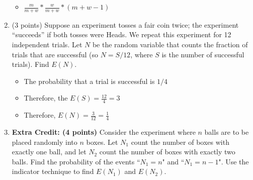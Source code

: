 \documentclass[11pt]{article}
\begin{document}
\begin{enumerate}
\begin{itemize}
	\item $\frac{m}{m+w}*\frac{w}{m+w}*(m+w-1)$
\end{itemize}

\item (3 points) Suppose an experiment tosses a fair coin twice;  the experiment
``succeeds'' if both tosses were Heads.  We repeat this experiment 
for 12 independent trials.  Let $N$ be the random variable that counts
the fraction of trials that are successful (so $N = S/12$, where
$S$ is the number of successful trials).  Find $E(N)$.

\begin{itemize}
	\item The probability that a trial is successful is $1/4$
	\item Therefore, the $E(S) = \frac{12}{4} = 3$
	\item Therefore, $E(N) = \frac{3}{12} = \frac{1}{4}$
\end{itemize}

\item \textbf{Extra Credit: (4 points)} Consider the experiment where $n$ balls
are to be placed randomly into $n$ boxes. Let $N_1$ count the number of boxes
with exactly one ball, and let $N_2$ count the number of boxes with exactly two
balls. Find the probability of the events ``$N_1 = n$" and ``$N_1 = n - 1$".
Use the indicator technique to find $E(N_1)$ and $E(N_2)$.


\end{enumerate}
\end{document}
